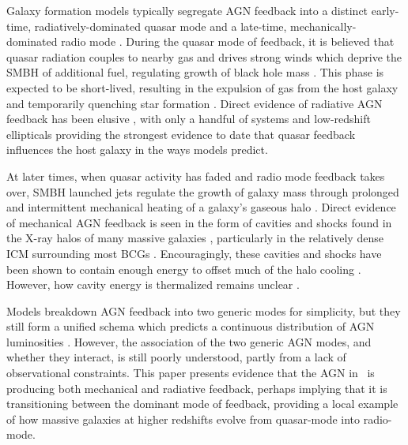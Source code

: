 \documentclass[useAMS,usenatbib]{mn2e}
\begin{document}
Galaxy formation models typically segregate AGN feedback into a
distinct early-time, radiatively-dominated quasar mode
\citep[\eg][]{2005Natur.435..629S, 2006ApJS..163....1H} and a
late-time, mechanically-dominated radio mode \citep[\eg][]{croton06,
  bower06}. During the quasar mode of feedback, it is believed that
quasar radiation couples to nearby gas and drives strong winds which
deprive the SMBH of additional fuel, regulating growth of black hole
mass \citep[\eg][]{2005ApJ...630..705H, 2005Natur.433..604D}. This
phase is expected to be short-lived, resulting in the expulsion of gas
from the host galaxy and temporarily quenching star formation
\citep[\eg][]{2006ApJ...642L.107N, 2008ApJ...686..219M}. Direct
evidence of radiative AGN feedback has been elusive \citep[see][for a
  review]{2005ARA&A..43..769V}, with only a handful of systems
\citep[\eg][]{2008A&A...492...81P, 2010arXiv1006.1655F} and
low-redshift ellipticals \citep{2009ApJ...690.1672S} providing the
strongest evidence to date that quasar feedback influences the host
galaxy in the ways models predict.

At later times, when quasar activity has faded and radio mode feedback
takes over, SMBH launched jets regulate the growth of galaxy mass
through prolonged and intermittent mechanical heating of a galaxy's
gaseous halo \citep{2005MNRAS.363....2K, 2006MNRAS.368....2D,
  mcnamrev}. Direct evidence of mechanical AGN feedback is seen in the
form of cavities and shocks found in the X-ray halos of many massive
galaxies \citep[\eg][]{2001ApJ...554..261C, 2007ApJ...665.1057F},
particularly in the relatively dense ICM surrounding most BCGs
\citep[\eg][]{perseus1, 2000ApJ...534L.135M}. Encouragingly, these
cavities and shocks have been shown to contain enough energy to offset
much of the halo cooling \citep{perseus2, birzan04, dunn06,
  rafferty06}. However, how cavity energy is thermalized remains
unclear \citep{2009arXiv0910.3691M, 2008ASPC..386..343D}.

Models breakdown AGN feedback into two generic modes for simplicity,
but they still form a unified schema \citep[\eg][]{sijacki07} which
predicts a continuous distribution of AGN luminosities
\citep[\eg][]{2009ApJ...698.1550H}. However, the association of the
two generic AGN modes, and whether they interact, is still poorly
understood, partly from a lack of observational constraints. This
paper presents evidence that the AGN in \irs\ is producing both
mechanical and radiative feedback, perhaps implying that it is
transitioning between the dominant mode of feedback, providing a local
example of how massive galaxies at higher redshifts evolve from
quasar-mode into radio-mode.
\end{document}
